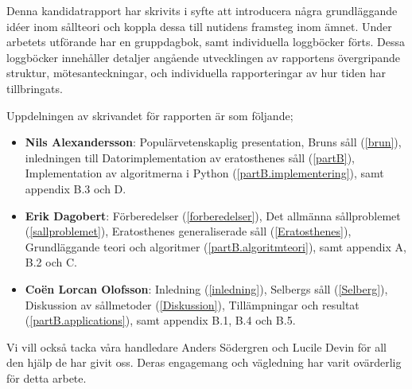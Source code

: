 Denna kandidatrapport har skrivits i syfte att introducera några grundläggande idéer inom sållteori och koppla dessa till nutidens framsteg inom ämnet.
Under arbetets utförande har en gruppdagbok, samt individuella loggböcker förts.
Dessa loggböcker innehåller detaljer angående utvecklingen av rapportens övergripande struktur, mötesanteckningar, och individuella rapporteringar av hur tiden har tillbringats.

Uppdelningen av skrivandet för rapporten är som följande;
\begin{itemize}
    \item \textbf{Nils Alexandersson}: 
        Populärvetenskaplig presentation,
        Bruns såll (\ref{brun}),
        inledningen till Datorimplementation av eratosthenes såll (\ref{partB}),
        Implementation av algoritmerna i Python (\ref{partB.implementering}),
        samt appendix B.3 och D.
    \item \textbf{Erik Dagobert}: 
        Förberedelser (\ref{forberedelser}), 
        Det allmänna sållproblemet (\ref{sallproblemet}), 
        Eratosthenes generaliserade såll (\ref{Eratosthenes}),
        Grundläggande teori och algoritmer (\ref{partB.algoritmteori}),
        samt appendix A, B.2 och C.
    \item \textbf{Coën Lorcan Olofsson}:
        Inledning (\ref{inledning}), 
        Selbergs såll (\ref{Selberg}),
        Diskussion av sållmetoder (\ref{Diskussion}),
        Tillämpningar och resultat (\ref{partB.applications}),
        samt appendix B.1, B.4 och B.5.
\end{itemize}
Vi vill också tacka våra handledare Anders Södergren och Lucile Devin för all den hjälp de har givit oss. 
Deras engagemang och vägledning har varit ovärderlig för detta arbete.